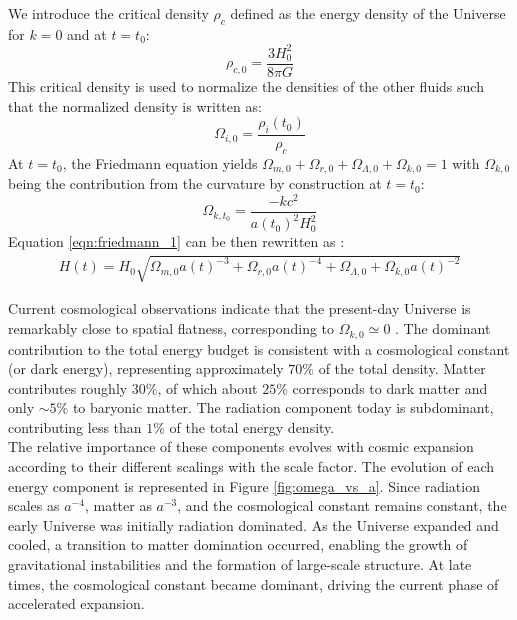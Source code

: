 We introduce the critical density $\rho_c$ defined as the energy density of the Universe for $k=0$ and at $t=t_0$:
\begin{equation}
    \rho_{c,0} = \frac{3H_0^2}{8\pi G}
\end{equation}
This critical density is used to normalize the densities of the other fluids such that the normalized density is written as:
\begin{equation}
    \Omega_{i,0} = \frac{\rho_i(t_0)}{\rho_c}
\end{equation}
At $t=t_0$, the Friedmann equation yields $\Omega_{m,0} + \Omega_{r,0} + \Omega_{\Lambda,0} + \Omega_{k,0} = 1$ with $\Omega_{k,0}$ being the contribution from the curvature by construction at $t=t_0$:
\begin{equation}
    \Omega_{k,t_0} = \frac{-kc^2}{a(t_0)^2H_0^2}
\end{equation}
Equation \ref{eqn:friedmann_1} can be then rewritten as :
\begin{eqnarray}
    H(t) = H_0 \sqrt{ \Omega_{m,0} a(t)^{-3} + \Omega_{r,0} a(t)^{-4} +\Omega_{\Lambda,0} +\Omega_{k,0} a(t)^{-2}}
\end{eqnarray}


Current cosmological observations indicate that the present-day Universe is remarkably close to spatial flatness, corresponding to $\Omega_{k,0}\simeq 0$ 
\cite{Planck_2018_params}. The dominant contribution to the total energy budget is consistent with a cosmological constant (or dark energy), representing 
approximately $70\%$ of the total density. Matter contributes roughly $30\%$, of which about $25\%$ corresponds to dark matter and only $\sim5\%$ to baryonic matter. 
The radiation component today is subdominant, contributing less than $1\%$ of the total energy density. \\

The relative importance of these components evolves with cosmic expansion according to their different scalings with the scale factor. The evolution of 
each energy component is represented in Figure \ref{fig:omega_vs_a}. Since radiation 
scales as $a^{-4}$, matter as $a^{-3}$, and the cosmological constant remains constant, the early Universe was initially radiation dominated. As the Universe 
expanded and cooled, a transition to matter domination occurred, enabling the growth of gravitational instabilities and the formation of large-scale structure. 
At late times, the cosmological constant became dominant, driving the current phase of accelerated expansion. \\

